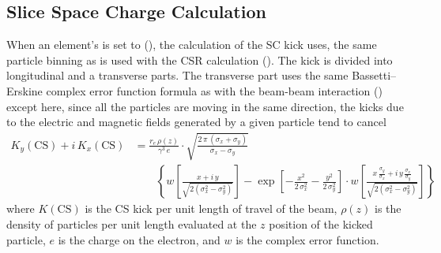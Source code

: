 \subsection{Slice Space Charge Calculation}
\label{s:sc.slice}

When an element's  is set to  (), the
calculation of the SC kick uses, the same particle binning as is used with the  CSR
calculation (). The kick is divided into longitudinal and a transverse parts. The
transverse part uses the same Bassetti--Erskine complex error function formula\cite{b:talman} as
with the beam-beam interaction () except here, since all the particles are
moving in the same direction, the kicks due to the electric and magnetic fields generated by a given
particle tend to cancel
\begin{align}
  K_y(\text{CS}) + i \, K_x(\text{CS}) &=
  \frac{r_e \, \rho(z)}{\gamma^3 \, e} \cdot
  \sqrt{\frac{2 \, \pi \, (\sigma_x + \sigma_y)}{\sigma_x - \sigma_y}} \label{fsp1r} \\
  & \qquad \left\{ w \left[ \frac{x + i \, y}{\sqrt{2 (\sigma_x^2 - \sigma_y^2)}} \right] -
  \exp \left[ -\frac{x^2}{2 \, \sigma_x^2} - \frac{y^2}{2 \, \sigma_y^2} \right] \cdot
  w \left[ \frac{x \, \frac{\sigma_y}{\sigma_x} + i \, y \, \frac{\sigma_x}{\sigma_y}}
  {\sqrt{2 (\sigma_x^2 - \sigma_y^2)}} \right] \right\}
  \nonumber
\end{align}
where $K(\text{CS})$ is the CS kick per unit length of travel of the beam, $\rho(z)$ is
the density of particles per unit length evaluated at the $z$ position of the kicked
particle, $e$ is the charge on the electron,  and $w$ is the complex error function.

